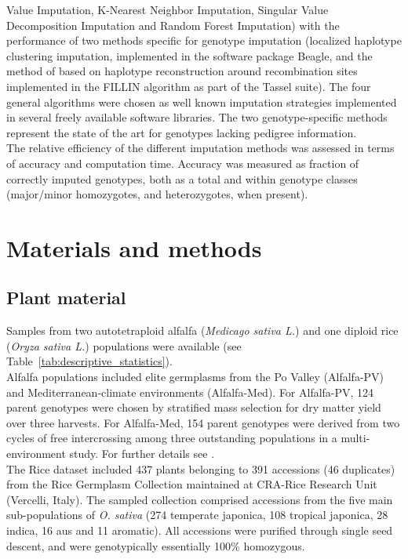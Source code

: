 Value Imputation, K-Nearest Neighbor Imputation, Singular Value Decomposition
Imputation and Random Forest Imputation) with the performance of two methods specific 
for genotype imputation (localized haplotype clustering imputation, 
implemented in the software package Beagle, and the method of based on haplotype
reconstruction around recombination sites implemented in the FILLIN algorithm
as part of the Tassel suite). The four general algorithms were chosen as well known 
imputation strategies implemented in several freely available software libraries.
The two genotype-specific methods represent the state of the art 
for genotypes lacking pedigree information.\\
The relative efficiency of the different imputation methods was assessed in terms of 
accuracy and computation time. Accuracy was measured as fraction of 
correctly imputed genotypes, both as a total and within genotype classes 
(major/minor homozygotes, and heterozygotes, when present).

 
\makeatletter{}\section{Materials and methods}

\subsection{Plant material}
\label{sec:plant_material}

Samples from two autotetraploid alfalfa (\emph{Medicago sativa L.}) and one diploid rice (\emph{Oryza sativa L.}) populations were available (see Table~\ref{tab:descriptive_statistics}).\\
Alfalfa populations included elite germplasms from the Po Valley (Alfalfa-PV) and Mediterranean-climate environments (Alfalfa-Med). For Alfalfa-PV, 124 parent genotypes were chosen by stratified mass selection for dry matter yield over three harvests. For Alfalfa-Med, 154 parent genotypes were derived from two cycles of free intercrossing among three outstanding populations in a multi-environment study. For further details see \cite{Annicchiarico2015}. \\
The Rice dataset included 437 plants belonging to 391 accessions (46 duplicates) from the Rice Germplasm Collection maintained at CRA-Rice Research Unit (Vercelli, Italy). The sampled collection comprised accessions from the five main sub-populations of \emph{O. sativa} (274 temperate japonica, 108 tropical japonica, 28 indica, 16 aus and 11 aromatic). All accessions were purified through single seed descent, and were genotypically essentially 100\% homozygous.

